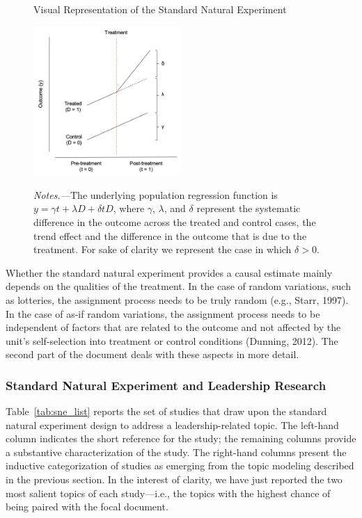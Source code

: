 \documentclass[english]{article}
\begin{document}
\begin{figure}[] 
	\centering
	\caption{Visual Representation of the Standard Natural Experiment}
	\includegraphics[width=0.5\textwidth]{_4}
	\label{fig:sne}
	\caption*{\textit{Notes.---}The underlying population regression
		function is $y = \gamma t + \lambda D + \delta t D$, where
		$\gamma$, $\lambda$, and $\delta$ represent the systematic
		difference in the outcome across the treated and control cases,
		the trend effect and the difference in the outcome that is due
	to the treatment. For sake of clarity we represent the case in which
$\delta > 0$.}
\end{figure}

Whether the standard natural experiment provides a causal estimate
mainly depends on the qualities of the treatment. In the case of random
variations, such as lotteries, the assignment process needs to be truly
random (e.g., Starr, 1997). In the case of as-if random variations, the
assignment process needs to be independent of factors that are related
to the outcome and not affected by the unit's self-selection into
treatment or control conditions (Dunning, 2012). The second part of the
document deals with these aspects in more detail.


\subsubsection{Standard Natural Experiment and Leadership Research}

\noindent Table~\ref{tab:sne_list} reports the set of studies that draw upon the
standard natural experiment design to address a leadership-related topic. The
left-hand column indicates the short reference for the study; the remaining
columns provide a substantive characterization of the study. The right-hand
columns present the inductive categorization of studies as emerging from the
topic modeling described in the previous section. In the interest of clarity, we
have just reported the two most salient topics of each study---i.e., the topics
with the highest chance of being paired with the focal document.
\end{document}
